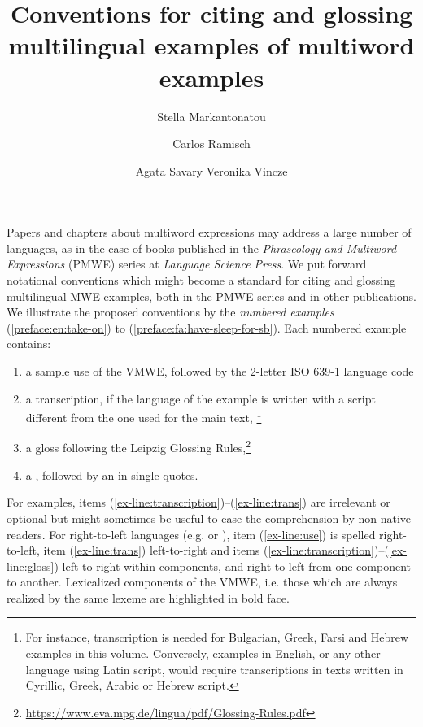 \documentclass[output=paper
,modfonts,hidelinks
,nonflat]{langsci/langscibook}
\title{Conventions for citing and glossing multilingual examples of multiword examples}
\author{
 Stella Markantonatou\affiliation{Institute for Language and Speech Processing, Athena RIC, Greece}\and 
 Carlos Ramisch\affiliation{Aix Marseille Univ, Université de Toulon, CNRS, LIS, Marseille, France}\and
 Agata Savary\affiliation{University of Tours, LIFAT, France}\lastand
 Veronika Vincze\affiliation{University of Szeged, Hungary}
}
\begin{document}
\maketitle
Papers and chapters about multiword expressions may address a large number of languages, as in the case of books published in the \textit{Phraseology and Multiword Expressions} (PMWE) series at \textit{Language Science Press}. We put forward notational conventions which might become a standard for citing and glossing multilingual MWE examples, both in the PMWE series and in other publications.
We illustrate the proposed conventions by the \emph{numbered examples}  (\ref{preface:en:take-on}) to (\ref{preface:fa:have-sleep-for-sb}). Each numbered example contains:
\begin{enumerate}%
\item\label{ex-line:use} a sample use of the VMWE, followed by the 2-letter ISO 639-1 language code %

\item\label{ex-line:transcription} a transcription, if the language of the example is written with a script different from the one used for the main text,
\footnote{For instance, transcription is needed for Bulgarian, Greek, Farsi and Hebrew examples in this volume. Conversely, examples in English, or any other language using Latin script, would require transcriptions in texts written in Cyrillic, Greek, Arabic or Hebrew script.}

\item\label{ex-line:gloss} a gloss following the Leipzig Glossing Rules,\footnote{\url{https://www.eva.mpg.de/lingua/pdf/Glossing-Rules.pdf}} 

\item\label{ex-line:trans} a , followed by an  in single quotes. 
\end{enumerate}

For  examples, items (\ref{ex-line:transcription})--(\ref{ex-line:trans}) are irrelevant or optional but  might sometimes be useful to ease the comprehension by non-native readers. For right-to-left languages (e.g.  or ), item (\ref{ex-line:use}) is spelled right-to-left, item (\ref{ex-line:trans}) left-to-right and items (\ref{ex-line:transcription})--(\ref{ex-line:gloss}) left-to-right within components, and right-to-left from one component to another. 
Lexicalized components of the VMWE, i.e. those which are always realized by the same lexeme are highlighted in bold face. 
\end{document}

